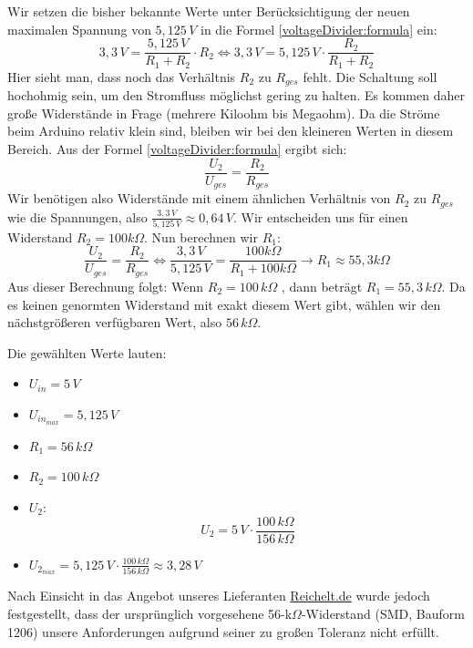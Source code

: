 	
	Wir setzen die bisher bekannte Werte unter Berücksichtigung der neuen maximalen Spannung von \(5,125\,V\) in die Formel \ref{voltageDivider:formula} ein:
	\begin{equation}
		3,3\,V = \frac{5,125\,V}{R_1 + R_2} \cdot R_2 \iff 3,3\,V = 5,125\,V \cdot \frac{R_2}{R_1 + R_2}
	\end{equation}
	Hier sieht man, dass noch das Verhältnis \(R_2\) zu \(R_{ges}\) fehlt.
	Die Schaltung soll hochohmig sein, um den Stromfluss möglichst gering zu halten. Es kommen daher gro{\ss}e Widerstände in Frage (mehrere Kiloohm bis Megaohm). Da die Ströme beim Arduino relativ klein sind, bleiben wir bei den kleineren Werten in diesem Bereich.
	Aus der Formel \ref{voltageDivider:formula} ergibt sich:
	\begin{equation}
		\frac{U_2}{U_{ges}} = \frac{R_2}{R_{ges}}
	\end{equation}
	Wir benötigen also Widerstände mit einem ähnlichen Verhältnis von \(R_2\) zu \(R_{ges}\) wie die Spannungen, also \(\frac{3,3\,V}{5,125\,V} \approx 0,64\,V\).
	Wir entscheiden uns für einen Widerstand \(R_2 = 100k\Omega\). Nun berechnen wir \(R_1\):
	\[
		\frac{U_2}{U_{ges}} = \frac{R_2}{R_{ges}} \iff \frac{3,3\,V}{5,125\,V} = \frac{100k\Omega}{R_1 + 100k\Omega} \rightarrow R_1 \approx 55,3k\Omega
	\]
	Aus dieser Berechnung folgt: Wenn \(R_2 = 100\,k\Omega\) , dann beträgt \(R_1 = 55,3\,k\Omega\). Da es keinen genormten Widerstand mit exakt diesem Wert gibt, wählen wir den nächstgrö{\ss}eren verfügbaren Wert, also \(56\,k\Omega\).
	
	Die gewählten Werte lauten:
	\begin{itemize}
		\item \(U_{in} = 5\,V \) 
		\item \(U_{in_{max}} = 5,125\,V \)
		\item \(R_{1} = 56\,k\Omega \)
		\item  \(R_{2} = 100\,k\Omega \)
		\item \(U_{2}\): \[U_{2} = 5\,V \cdot \frac{100\,k\Omega}{156\,k\Omega}\]
		\item \(U_{2_{max}} = 5,125\,V \cdot \frac{100\,k\Omega}{156\,k\Omega} \approx 3,28\,V\)
	\end{itemize}
	
	Nach Einsicht in das Angebot unseres Lieferanten \href{https://www.reichelt.de/de/de/}{Reichelt.de} wurde jedoch festgestellt, dass der ursprünglich vorgesehene 56-k\(\Omega\)-Widerstand (SMD, Bauform 1206) unsere Anforderungen aufgrund seiner zu gro{\ss}en Toleranz nicht erfüllt.
	
